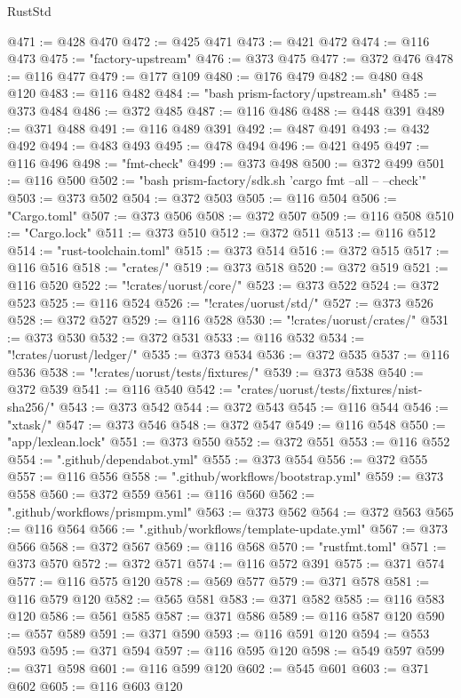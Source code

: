 \begin{lexlean}{RustStd}
\begin{coremodule}
@471 := @428 @470
@472 := @425 @471
@473 := @421 @472
@474 := @116 @473
@475 := "factory-upstream"
@476 := @373 @475
@477 := @372 @476
@478 := @116 @477
@479 := @177 @109
@480 := @176 @479
@482 := @480 @48 @120
@483 := @116 @482
@484 := "bash prism-factory/upstream.sh"
@485 := @373 @484
@486 := @372 @485
@487 := @116 @486
@488 := @448 @391
@489 := @371 @488
@491 := @116 @489 @391
@492 := @487 @491
@493 := @432 @492
@494 := @483 @493
@495 := @478 @494
@496 := @421 @495
@497 := @116 @496
@498 := "fmt-check"
@499 := @373 @498
@500 := @372 @499
@501 := @116 @500
@502 := "bash prism-factory/sdk.sh 'cargo fmt --all -- --check'"
@503 := @373 @502
@504 := @372 @503
@505 := @116 @504
@506 := "Cargo.toml"
@507 := @373 @506
@508 := @372 @507
@509 := @116 @508
@510 := "Cargo.lock"
@511 := @373 @510
@512 := @372 @511
@513 := @116 @512
@514 := "rust-toolchain.toml"
@515 := @373 @514
@516 := @372 @515
@517 := @116 @516
@518 := "crates/"
@519 := @373 @518
@520 := @372 @519
@521 := @116 @520
@522 := "!crates/uorust/core/"
@523 := @373 @522
@524 := @372 @523
@525 := @116 @524
@526 := "!crates/uorust/std/"
@527 := @373 @526
@528 := @372 @527
@529 := @116 @528
@530 := "!crates/uorust/crates/"
@531 := @373 @530
@532 := @372 @531
@533 := @116 @532
@534 := "!crates/uorust/ledger/"
@535 := @373 @534
@536 := @372 @535
@537 := @116 @536
@538 := "!crates/uorust/tests/fixtures/"
@539 := @373 @538
@540 := @372 @539
@541 := @116 @540
@542 := "crates/uorust/tests/fixtures/nist-sha256/"
@543 := @373 @542
@544 := @372 @543
@545 := @116 @544
@546 := "xtask/"
@547 := @373 @546
@548 := @372 @547
@549 := @116 @548
@550 := "app/lexlean.lock"
@551 := @373 @550
@552 := @372 @551
@553 := @116 @552
@554 := ".github/dependabot.yml"
@555 := @373 @554
@556 := @372 @555
@557 := @116 @556
@558 := ".github/workflows/bootstrap.yml"
@559 := @373 @558
@560 := @372 @559
@561 := @116 @560
@562 := ".github/workflows/prismpm.yml"
@563 := @373 @562
@564 := @372 @563
@565 := @116 @564
@566 := ".github/workflows/template-update.yml"
@567 := @373 @566
@568 := @372 @567
@569 := @116 @568
@570 := "rustfmt.toml"
@571 := @373 @570
@572 := @372 @571
@574 := @116 @572 @391
@575 := @371 @574
@577 := @116 @575 @120
@578 := @569 @577
@579 := @371 @578
@581 := @116 @579 @120
@582 := @565 @581
@583 := @371 @582
@585 := @116 @583 @120
@586 := @561 @585
@587 := @371 @586
@589 := @116 @587 @120
@590 := @557 @589
@591 := @371 @590
@593 := @116 @591 @120
@594 := @553 @593
@595 := @371 @594
@597 := @116 @595 @120
@598 := @549 @597
@599 := @371 @598
@601 := @116 @599 @120
@602 := @545 @601
@603 := @371 @602
@605 := @116 @603 @120

\end{coremodule}
\end{lexlean}
